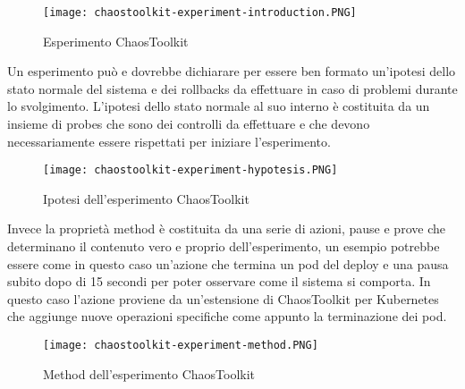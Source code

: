 \begin{figure}[]
    \centering
    \texttt{[image: chaostoolkit-experiment-introduction.PNG]}
    \caption{Esperimento ChaosToolkit}
    \label{tab:introduzione-chaostoolkit}
\end{figure}
Un esperimento può e dovrebbe dichiarare per essere ben formato un'ipotesi dello stato normale del sistema e dei rollbacks da effettuare in caso di problemi durante lo svolgimento.
L'ipotesi dello stato normale al suo interno è costituita da un insieme di probes che sono dei controlli da effettuare e che devono necessariamente essere rispettati per iniziare l'esperimento.
\begin{figure}[]
    \centering
    \texttt{[image: chaostoolkit-experiment-hypotesis.PNG]}
    \caption{Ipotesi dell'esperimento ChaosToolkit}
    \label{tab:ipotesi-chaostoolkit}
\end{figure}
Invece la proprietà method è costituita da una serie di azioni, pause e prove che determinano il contenuto vero e proprio dell'esperimento, un esempio potrebbe essere come in questo caso un'azione che termina un pod del deploy e una pausa subito dopo di 15 secondi per poter osservare come il sistema si comporta.
In questo caso l'azione proviene da un'estensione di ChaosToolkit per Kubernetes che aggiunge nuove operazioni specifiche come appunto la terminazione dei pod.
\begin{figure}[]
    \centering
    \texttt{[image: chaostoolkit-experiment-method.PNG]}
    \caption{Method dell'esperimento ChaosToolkit}
    \label{tab:method-chaostoolkit}
\end{figure}

